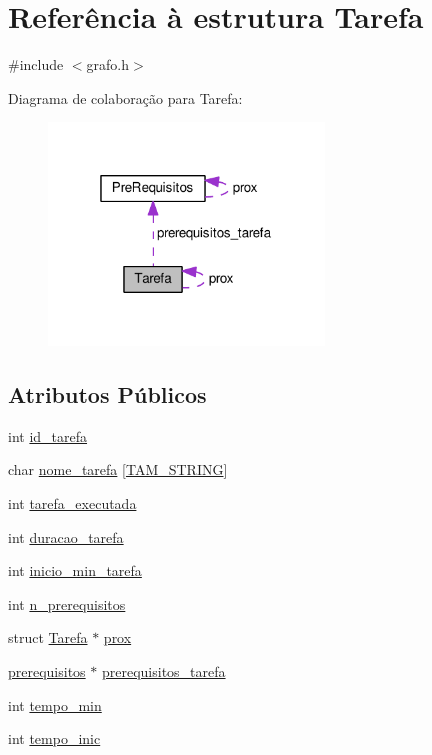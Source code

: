 \hypertarget{structTarefa}{\section{Referência à estrutura Tarefa}
\label{structTarefa}
}


{\ttfamily \#include $<$grafo.\-h$>$}



Diagrama de colaboração para Tarefa\-:\nopagebreak
\begin{figure}[H]
\begin{center}
\leavevmode
\includegraphics[width=208pt]{structTarefa__coll__graph}
\end{center}
\end{figure}
\subsection*{Atributos Públicos}
\begin{DoxyCompactItemize}
\item 
int \hyperlink{structTarefa_a1509b75b75f758e2d0502df4162366f2}{id\-\_\-tarefa}
\item 
char \hyperlink{structTarefa_aa4224aa0787334f3194ba773f3924ade}{nome\-\_\-tarefa} \mbox{[}\hyperlink{include_2grafo_8h_a5d28dfdab86222715d699097e8cd092f}{T\-A\-M\-\_\-\-S\-T\-R\-I\-N\-G}\mbox{]}
\item 
int \hyperlink{structTarefa_a86ef331b855e3f91eec492a00171cc9c}{tarefa\-\_\-executada}
\item 
int \hyperlink{structTarefa_a7962bef326f487f4ffa7dc0f04153729}{duracao\-\_\-tarefa}
\item 
int \hyperlink{structTarefa_a7d09c30d0162c55a0aab1ad71716fae6}{inicio\-\_\-min\-\_\-tarefa}
\item 
int \hyperlink{structTarefa_a9f6369cef91f4b9d544d9e1be0bc705f}{n\-\_\-prerequisitos}
\item 
struct \hyperlink{structTarefa}{Tarefa} $\ast$ \hyperlink{structTarefa_a965f93c11a90c05d417d2e1ed8eac327}{prox}
\item 
\hyperlink{code_2grafo_8h_a8d260ebf15bfe9b5f9366d2245289e15}{prerequisitos} $\ast$ \hyperlink{structTarefa_ad29b83112b237fad5d5d56f39b21f6a6}{prerequisitos\-\_\-tarefa}
\item 
int \hyperlink{structTarefa_a4fd1b4c3fd98a3fb754116f6cc80c906}{tempo\-\_\-min}
\item 
int \hyperlink{structTarefa_a202a3c8fbee0bf74488fa057587f13df}{tempo\-\_\-inic}
\end{DoxyCompactItemize}


